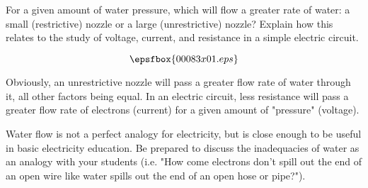

For a given amount of water pressure, which will flow a greater rate of water: a small (restrictive) nozzle or a large (unrestrictive) nozzle?  Explain how this relates to the study of voltage, current, and resistance in a simple electric circuit.

$$\epsfbox{00083x01.eps}$$







Obviously, an unrestrictive nozzle will pass a greater flow rate of water through it, all other factors being equal.  In an electric circuit, less resistance will pass a greater flow rate of electrons (current) for a given amount of "pressure" (voltage).







Water flow is not a perfect analogy for electricity, but is close enough to be useful in basic electricity education.  Be prepared to discuss the inadequacies of water as an analogy with your students (i.e. "How come electrons don't spill out the end of an open wire like water spills out the end of an open hose or pipe?").




